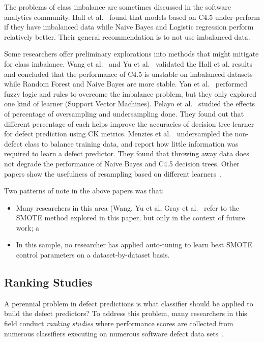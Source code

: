 \documentclass[10pt,conference]{IEEEtran}
\newcommand{\bi}{\begin{itemize}[leftmargin=0.4cm]}
\newcommand{\ei}{\end{itemize}}
\theoremstyle{break}
\theoremstyle{break}
\begin{document}
The problems of class imbalance are sometimes discussed in the software analytics community.
Hall et al.~\cite{hall2012systematic} found that models based on C4.5 under-perform if they have imbalanced data while Naive Bayes and Logistic regression perform relatively better. 
Their general recommendation is to not use
imbalanced data.  

Some researchers offer preliminary explorations into methods that might mitigate for class imbalance.
Wang et al.~\cite{wang2013using} and Yu et al.~\cite{yuperformance} validated the Hall et al. results and concluded that the
performance of C4.5 is unstable on imbalanced datasets while  Random Forest and Naive Bayes are 
more stable. 
Yan et al.~\cite{yan2010software} performed fuzzy logic and rules to overcome the imbalance problem, but they only
explored one kind of learner (Support Vector Machines).
Pelayo et al.~\cite{pelayo2007applying} studied the effects of percentage of oversampling and undersampling done. They found out that different percentage of each helps improve the accuracies of decision tree learner for defect prediction using CK metrics. Menzies et al.~\cite{menzies2008implications} undersampled the non-defect class to balance training
data, and report how little information was required to learn a defect predictor. They found that throwing away data does not degrade the performance of Naive Bayes and C4.5 decision trees. Other papers show the usefulness of resampling based on different learners~\cite{pelayo2007applying, pelayo2012evaluating, riquelme2008finding}.

Two patterns of note in the above papers was that:
\bi
\item
Many researchers in this area  (Wang, Yu et al,  Gray et al.~\cite{gray2009using,yuperformance,wang2013using} refer to the SMOTE method explored in this paper,  but only in the context of future work; a
\item
In this sample, no researcher has  applied auto-tuning to learn best SMOTE control parameters on a dataset-by-dataset basis.
\ei


\subsection{Ranking Studies}

A perennial problem in defect predictions is what  classifier should be applied to  build  the  defect  predictors?
To address this problem, many researchers in this field conduct {\em ranking studies} where  performance scores 
are collected from  numerous classifiers  executing on  numerous software defect data sets~\cite{lessmann2008benchmarking,hall2012systematic,elish2008predicting,menzies2010defect,gondra2008applying,radjenovic2013software,jiang2008techniques,wang2013using,mende2009revisiting,li2012sample,khoshgoftaar2010attribute,jiang2009variance,ghotra2015revisiting,jiang2008can,tantithamthavorn2016automated,fu2016tuning}.
\end{document}
